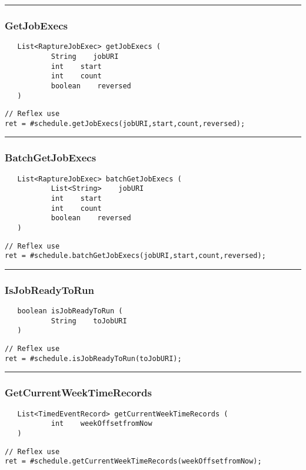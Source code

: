 \rule{15cm}{2pt}
\subsubsection{GetJobExecs}
\label{Api:GetJobExecs}
\begin{verbatim}
   List<RaptureJobExec> getJobExecs (
           String    jobURI
           int    start
           int    count
           boolean    reversed
   )
\end{verbatim}
\begin{lstlisting}[language=reflex]
// Reflex use
ret = #schedule.getJobExecs(jobURI,start,count,reversed);
\end{lstlisting}



\rule{15cm}{2pt}
\subsubsection{BatchGetJobExecs}
\label{Api:BatchGetJobExecs}
\begin{verbatim}
   List<RaptureJobExec> batchGetJobExecs (
           List<String>    jobURI
           int    start
           int    count
           boolean    reversed
   )
\end{verbatim}
\begin{lstlisting}[language=reflex]
// Reflex use
ret = #schedule.batchGetJobExecs(jobURI,start,count,reversed);
\end{lstlisting}



\rule{15cm}{2pt}
\subsubsection{IsJobReadyToRun}
\label{Api:IsJobReadyToRun}
\begin{verbatim}
   boolean isJobReadyToRun (
           String    toJobURI
   )
\end{verbatim}
\begin{lstlisting}[language=reflex]
// Reflex use
ret = #schedule.isJobReadyToRun(toJobURI);
\end{lstlisting}



\rule{15cm}{2pt}
\subsubsection{GetCurrentWeekTimeRecords}
\label{Api:GetCurrentWeekTimeRecords}
\begin{verbatim}
   List<TimedEventRecord> getCurrentWeekTimeRecords (
           int    weekOffsetfromNow
   )
\end{verbatim}
\begin{lstlisting}[language=reflex]
// Reflex use
ret = #schedule.getCurrentWeekTimeRecords(weekOffsetfromNow);
\end{lstlisting}



